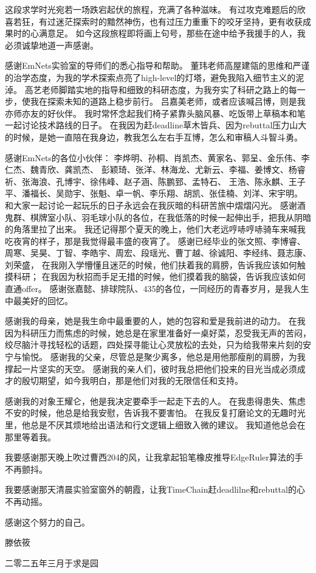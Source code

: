 \cleardoublepage
{}
这段求学时光宛若一场跌宕起伏的旅程，充满了各种滋味。
有过攻克难题后的欣喜若狂，有过迷茫探索时的黯然神伤，也有过压力重重下的咬牙坚持，更有收获成果时的心满意足。
如今这段旅程即将画上句号，那些在途中给予我援手的人，我必须诚挚地道一声感谢。

感谢EmNets实验室的导师们的悉心指导和帮助。
董玮老师高屋建瓴的思维和严谨的治学态度，为我的学术探索点亮了high-level的灯塔，避免我陷入细节主义的泥淖。
高艺老师脚踏实地的指导和细致的科研态度，为我夯实了科研之路上的每一步，使我在探索未知的道路上稳步前行。
吕嘉美老师，或者应该喊吕博，则是我亦师亦友的好伙伴。
我时常怀念起我们椅子紧靠头脑风暴、吃饭带上草稿本和笔一起讨论技术路线的日子。
在我因为赶deadline草木皆兵、因为rebuttal压力山大的时候，是她一直陪在我身边，教我怎么左右手互博，怎么和审稿人斗智斗勇。

感谢EmNets的各位小伙伴：
李烨明、孙桐、肖凯杰、黄家名、郭呈、金乐伟、李仁杰、魏青欣、龚凯杰、
彭颖琦、张洋、林海龙、尤新云、李福、姜博文、杨睿祈、张海浪、孔博宇、徐伟峰、赵子涵、陈鹏郅、孟特石、
王浩、陈永麒、王子平、潘福长、吴勋宇、张魁、卓一帆、李乐翔、胡凯、张佳楠、刘洋、宋宇明。
和大家一起讨论一起玩乐的日子永远会在我灰暗的科研苦旅中熠熠闪光。
感谢酒鬼群、棋牌室小队、羽毛球小队的各位，在我低落的时候一起伸出手，把我从阴暗的角落里拉了出来。
我还记得那个夏天的晚上，他们大老远哼哧哼哧骑车来喊我吃夜宵的样子，那是我觉得最丰盛的夜宵了。
感谢已经毕业的张文照、李博睿、周寒、吴昊、丁智、李皓宇、周宏、段瑶光、曹丁越、徐诚阳、李经纬、聂志康、刘荣盛，
在我刚入学懵懂且迷茫的时候，他们扶着我的肩膀，告诉我应该如何触摸科研；
在我因为秋招而手足无措的时候，他们摸着我的脑袋，告诉我应该如何直通offer。
感谢张嘉懿、排球院队、435的各位，一同经历的青春岁月，是我人生中最美好的回忆。

感谢我的母亲，她是我生命中最重要的人，她的包容和爱是我前进的动力。
在我因为科研压力而焦虑的时候，她总是在家里准备好一桌好菜，忍受我无声的苦闷，
绞尽脑汁寻找轻松的话题，四处探寻能让心灵放松的去处，只为给我带来片刻的安宁与愉悦。
感谢我的父亲，尽管总是聚少离多，他总是用他那瘦削的肩膀，为我撑起一片坚实的天空。
感谢我的亲人们，彼时我总把他们投来的目光当成必须成才的殷切期望，如今我明白，那是他们对我的无限信任和支持。

感谢我的对象王耀仑，他是我决定要牵手一起走下去的人。
在我患得患失、焦虑不安的时候，他总是给我安慰，告诉我不要害怕。
在我反复打磨论文的无趣时光里，他总是不厌其烦地给出语法和行文逻辑上细致入微的建议。
我知道他总会在那里等着我。

我要感谢那天晚上吹过曹西204的风，让我拿起铅笔橡皮推导EdgeRuler算法的手不再颤抖。

我要感谢那天清晨实验室窗外的朝霞，让我TimeChain赶deadlilne和rebuttal的心不再动摇。

感谢这个努力的自己。

\vspace{\baselineskip}

\noindent\hfill 滕依筱

\noindent\hfill 二零二五年三月于求是园 \\
